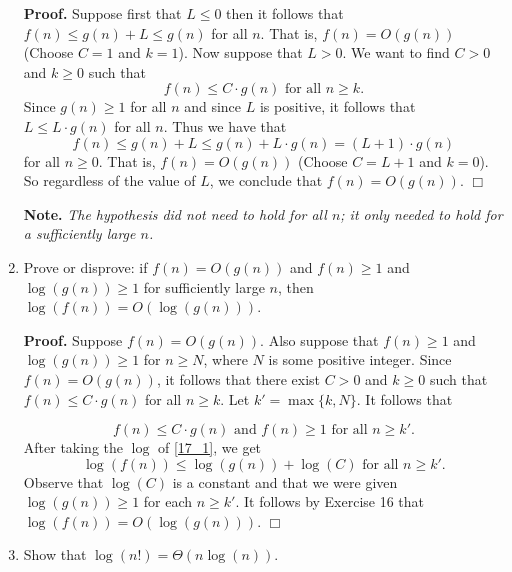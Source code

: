 \documentclass[9pt]{article}
\newcommand{\qed}{\hfill \ensuremath{\Box}}
\begin{document}
\begin{enumerate}
      \textbf{Proof.} Suppose first that $L \le 0$ then it follows that
      $f(n) \le g(n) + L \le g(n)$ for all $n$. That is, $f(n) = O(g(n))$
      (Choose $C = 1$ and $k = 1$). Now suppose that $L > 0$. We want to find
      $C > 0$ and $k \ge 0$ such that
      $$f(n) \le C \cdot g(n) \text{ for all } n \ge k.$$
      Since $g(n) \ge 1$ for all $n$ and since $L$ is positive, it follows
      that $L \le L \cdot g(n)$ for all $n$. Thus we have that
      $$f(n) \le g(n) + L \le g(n) + L \cdot g(n) = (L+1) \cdot g(n)$$
      for all $n \ge 0$. That is, $f(n) = O(g(n))$ (Choose $C = L + 1$ and
      $k = 0$). So regardless of the value of $L$, we conclude that
      $f(n) = O(g(n))$. \qed

      \textbf{Note.} \textit{The hypothesis did not need to hold for all $n$; it 
      only needed to hold for a sufficiently large $n$.}
   \item Prove or disprove: if $f(n) = O(g(n))$ and $f(n) \ge 1$ and
         $\log(g(n)) \ge 1$ for sufficiently large $n$, then
         $\log(f(n)) = O(\log(g(n)))$.

      \textbf{Proof.} Suppose $f(n) = O(g(n))$. Also suppose that $f(n) \ge 1$
      and $\log(g(n)) \ge 1$ for $n \ge N$, where $N$ is some positive integer.
      Since $f(n) = O(g(n))$, it follows that there exist $C > 0$ and $k \ge 0$
      such that $f(n) \le C \cdot g(n)$ for all $n \ge k$. Let
      $k' = \max\{k, N\}$. It follows that 

      \begin{equation} \label{17_1}
         f(n) \le C \cdot g(n) \text{ and } f(n) \ge 1 \text{ for all }n \ge k'.
      \end{equation}
      After taking the $\log$ of \eqref{17_1}, we get
      $$\log(f(n)) \le \log(g(n)) + \log(C) \text{ for all }n \ge k'.$$
      Observe that $\log(C)$ is a constant and that we were given
      $\log(g(n)) \ge 1$ for each $n \ge k'$. It follows by Exercise 16 that
      $\log(f(n)) = O(\log(g(n)))$. \qed
   \item Show that $\log(n!) = \Theta(n\log(n))$.


\end{enumerate}
\end{document}
